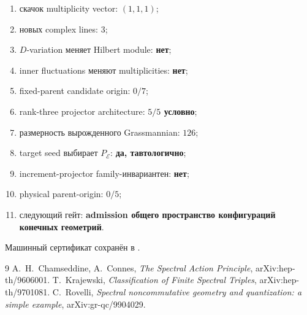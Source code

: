 \begin{protocol}\begin{enumerate}
\item скачок multiplicity vector: \textbf{$(1,1,1)$};
\item новых complex lines: \textbf{$3$};
\item $D$-variation меняет Hilbert module: \textbf{нет};
\item inner fluctuations меняют multiplicities: \textbf{нет};
\item fixed-parent candidate origin: \textbf{$0/7$};
\item rank-three projector architecture: \textbf{$5/5$ условно};
\item размерность вырожденного Grassmannian: \textbf{$126$};
\item target seed выбирает $P_{\mathcal E}$: \textbf{да, тавтологично};
\item increment-projector family-инвариантен: \textbf{нет};
\item physical parent-origin: \textbf{$0/5$};
\item следующий гейт: \textbf{admission общего пространство конфигураций конечных геометрий}.
\end{enumerate}\end{protocol}

Машинный сертификат сохранён в
.

\begin{thebibliography}{9}
A.~H.~Chamseddine, A.~Connes,
\emph{The Spectral Action Principle}, arXiv:hep-th/9606001.
T.~Krajewski, \emph{Classification of Finite Spectral Triples},
arXiv:hep-th/9701081.
C.~Rovelli, \emph{Spectral noncommutative geometry and quantization:
a simple example}, arXiv:gr-qc/9904029.
\end{thebibliography}